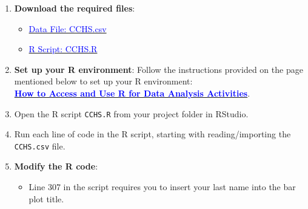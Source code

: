 \documentclass[oneside,openany]{book}
\providecommand{\tightlist}{%
  \setlength{\itemsep}{0pt}\setlength{\parskip}{0pt}}
\begin{document}
\begin{enumerate}
\def\labelenumi{\arabic{enumi}.}
\item
  \textbf{Download the required files}:

  \begin{itemize}
  \tightlist
  \item
    \href{https://raw.githubusercontent.com/aslemand/Data-Analysis-Activities/refs/heads/main/data/Activity_9/CCHS.csv}{\textcolor{blue}{Data File: CCHS.csv}}
  \item
    \href{https://raw.githubusercontent.com/aslemand/Data-Analysis-Activities/refs/heads/main/data/Activity_9/CCHS.R}{\textcolor{blue}{R Script: CCHS.R}}
  \end{itemize}
\item
  \textbf{Set up your R environment}:
  Follow the instructions provided on the page mentioned below to set up your R environment:\\
  \hyperref[how-to-set-up-r-for-data-analysis-activities]{\textcolor{blue}{\textbf{How to Access and Use R for Data Analysis Activities}}}.
\item
  Open the R script \texttt{CCHS.R} from your project folder in RStudio.
\item
  Run each line of code in the R script, starting with reading/importing the \texttt{CCHS.csv} file.
\item
  \textbf{Modify the R code}:

  \begin{itemize}
  \tightlist
  \item
    Line 307 in the script requires you to insert your last name into the bar plot title.
  \end{itemize}


\end{enumerate}
\end{document}

